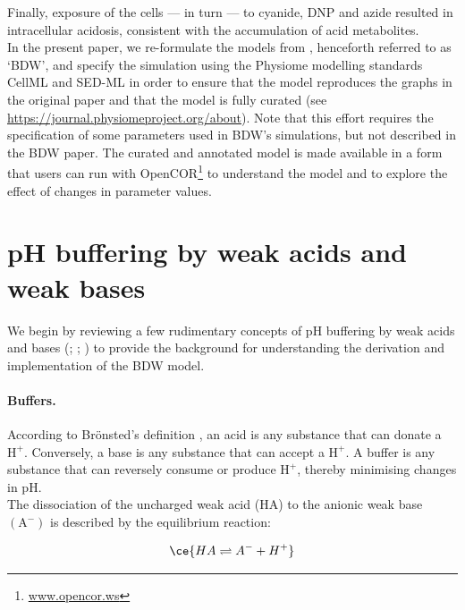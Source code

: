 \documentclass[fleqn,10pt]{physiome}
\begin{document}
Finally, exposure of the cells --- in turn --- to cyanide, DNP and azide resulted in intracellular acidosis, consistent with the accumulation of acid metabolites.\\

In the present paper, we re-formulate the models from \cite{boron1976intracellular}, henceforth referred to as `BDW', and specify the simulation using the Physiome modelling standards CellML \citep{cuellar2003overview} and SED-ML \citep{bergmann2017sed} in order to ensure that the model reproduces the graphs in the original paper and that the model is fully curated (see \url{https://journal.physiomeproject.org/about}). Note that this effort requires the specification of some parameters used in BDW's simulations, but not described in the BDW paper. The curated and annotated model is made available in a form that users can run with OpenCOR\footnote{\url{www.opencor.ws}} to understand the model and to explore the effect of changes in parameter values.\\

\section{pH buffering by weak acids and weak bases}

We begin by reviewing a few rudimentary concepts of $\mathrm{pH}$ buffering by weak acids and bases (\cite{roos1981intracellular}; \cite{bevensee2013control}; \cite{boron2016medical}) to provide the background for understanding the derivation and implementation of the BDW model.

\paragraph{Buffers.}
According to Br\"{o}nsted's definition \citep{bronsted1923einige}, an acid is any substance that can donate a $\mathrm{H^+}$. Conversely, a base is any substance that can accept a $\mathrm{H^+}$. A buffer is any substance that can reversely consume or produce $\mathrm{H^+}$, thereby minimising changes in $\mathrm{pH}$.\\

The dissociation of the uncharged weak acid (HA) to the anionic weak base $\mathrm{(A^-)}$ is described by the equilibrium reaction:

\begin{equation}
\ce{HA \rightleftharpoons A^- + H^+}
\end{equation}
\end{document}
